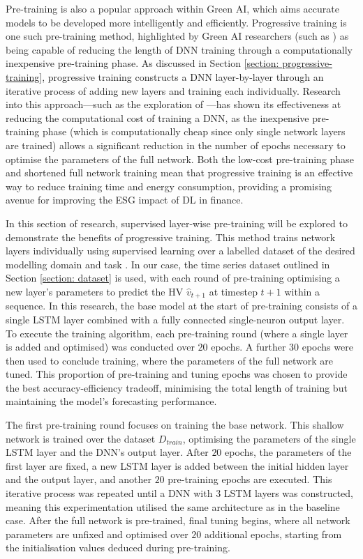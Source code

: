 \documentclass[a4paper, 11pt]{report}
\begin{document}
    Pre-training is also a popular approach within Green AI, which aims accurate models to be developed more intelligently and efficiently. Progressive training is one such pre-training method, highlighted by Green AI researchers (such as \citet{xu-2021}) as being capable of reducing the length of DNN training through a computationally inexpensive pre-training phase. As discussed in Section \ref{section: progressive-training}, progressive training constructs a DNN layer-by-layer through an iterative process of adding new layers and training each individually. Research into this approach---such as the exploration of \citet{ienco-2019}---has shown its effectiveness at reducing the computational cost of training a DNN, as the inexpensive pre-training phase (which is computationally cheap since only single network layers are trained) allows a significant reduction in the number of epochs necessary to optimise the parameters of the full network. Both the low-cost pre-training phase and shortened full network training mean that progressive training is an effective way to reduce training time and energy consumption, providing a promising avenue for improving the ESG impact of DL in finance.

    In this section of research, supervised layer-wise pre-training will be explored to demonstrate the benefits of progressive training. This method trains network layers individually using supervised learning over a labelled dataset of the desired modelling domain and task \citep{ienco-2019}. In our case, the time series dataset outlined in Section \ref{section: dataset} is used, with each round of pre-training optimising a new layer's parameters to predict the HV $\hat{v}_{t+1}$ at timestep $t+1$ within a sequence. In this research, the base model at the start of pre-training consists of a single LSTM layer combined with a fully connected single-neuron output layer. To execute the training algorithm, each pre-training round (where a single layer is added and optimised) was conducted over $20$ epochs. A further $30$ epochs were then used to conclude training, where the parameters of the full network are tuned. This proportion of pre-training and tuning epochs was chosen  to provide the best accuracy-efficiency tradeoff, minimising the total length of training but maintaining the model's forecasting performance. 

    The first pre-training round focuses on training the base network. This shallow network is trained over the dataset $D_{train}$, optimising the parameters of the single LSTM layer and the DNN's output layer. After $20$ epochs, the parameters of the first layer are fixed, a new LSTM layer is added between the initial hidden layer and the output layer, and another $20$ pre-training epochs are executed. This iterative process was repeated until a DNN with $3$ LSTM layers was constructed, meaning this experimentation utilised the same architecture as in the baseline case. After the full network is pre-trained, final tuning begins, where all network parameters are unfixed and optimised over $20$ additional epochs, starting from the initialisation values deduced during pre-training.
\end{document}
